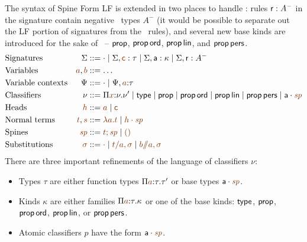 The syntax of Spine Form LF is extended in two places to handle \sls:
rules ${\sf r} : A^-$ in the signature contain negative \sls~types
$A^-$ (it would be possible to separate out the LF portion of
signatures from the \sls~rules), and several new base kinds
are introduced for the sake of \sls~-- ${\sf prop}$, ${\sf prop}\,{\sf
  ord}$, ${\sf prop}\,{\sf lin}$, and ${\sf prop}\,{\sf pers}$.
\begin{align*}
& \mbox{Signatures} & \Sigma & ::= \cdot 
  \mid \Sigma, \lf{\sf c} : \tau
  \mid \Sigma, {\sf a} : \kappa
  \mid \Sigma, {\sf r} : A^-
\\
& \mbox{Variables} & \lf{a}, \lf{b} & ::= \ldots
\\
& \mbox{Variable contexts} & \Psi & ::= \cdot
  \mid \Psi, \lf{a} {:} \tau 
\\
& \mbox{Classifiers} & \nu & ::= \lfpi{x}{\nu}{\nu'} \mid {\sf type}
  \mid {\sf prop}
  \mid {\sf prop}\,{\sf ord}
  \mid {\sf prop}\,{\sf lin}
  \mid {\sf prop}\,{\sf pers}
  \mid \lfroot{\sf a}{\spi}
\\
& \mbox{Heads} & \lf{h} & ::= \lf{a} \mid \lf{\sf c}
\\
& \mbox{Normal terms} & \lf{t}, \lf{s} & ::= \lf{\lambda a.t}
  \mid \lf{\lfroot{h}{\spi}}
\\
& \mbox{Spines} & \lf{\spi} & ::= \lf{t; \spi} \mid \lf{\lfnil}
\\
& \mbox{Substitutions} & \lf{\sigma} & ::= \lf{\cdot}
  \mid \lf{t/a, \sigma}
  \mid \lf{b/\!\!/a, \sigma}
\end{align*}
\noindent
There are three important refinements of the language of classifiers $\nu$:
\smallskip
\begin{itemize}
\item Types $\tau$ are either function types $\lfpi{a}{\tau}{\tau'}$
  or base types $\lfroot{\sf a}{\spi}$.
\item Kinds $\kappa$ are either families $\lfpi{a}{\tau}{\kappa}$ or
  one of the base kinds: ${\sf type}$, ${\sf prop}$, ${\sf prop}\,{\sf
    ord}$, ${\sf prop}\,{\sf lin}$, or ${\sf prop}\,{\sf pers}$.
\item Atomic classifiers $p$ have the form $\lfroot{\sf a}{\spi}$.
\end{itemize}
\smallskip

